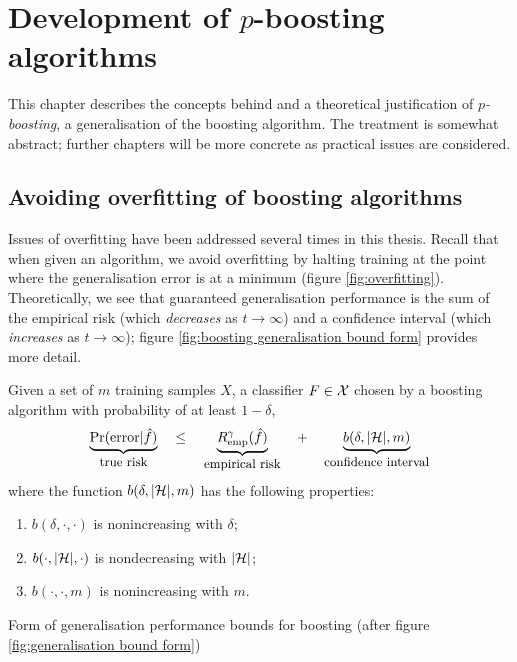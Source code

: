
\chapter{Development of $p$-boosting algorithms}
\label{chapter:pboosting}

This chapter describes the concepts behind and a theoretical
justification of \emph{$p$-boosting}, a generalisation of the boosting
algorithm.  The treatment is somewhat abstract; further chapters will
be more concrete as practical issues are considered.

\section{Avoiding overfitting of boosting algorithms}

Issues of overfitting have been addressed several times in this
thesis.  Recall that when given an algorithm, we avoid overfitting by
halting training at the point where the generalisation error is at a
minimum (figure \ref{fig:overfitting}).  Theoretically, we see that
guaranteed generalisation performance is the sum of the empirical risk
(which \emph{decreases} as $t \rightarrow \infty$) and a confidence
interval (which \emph{increases} as $t \rightarrow \infty$); figure
\ref{fig:boosting generalisation bound form} provides more detail.

\begin{linefigure}
Given a set of $m$ training samples $X$, a classifier $F \in \mathcal{X}$
chosen by a boosting algorithm  with probability of at least $1 - \delta$,
%
\begin{equation}
\underbrace{\Pr(\mathrm{error}|\hat{f})}_{\mbox{\small{true risk}}}
\quad \leq \quad
\underbrace{R_{\mathrm{emp}}^{\gamma}(\hat{f})}_{\mbox{\small{empirical risk}}}
\quad + \quad
\underbrace{b(\delta, |\mathcal{H}|, m)}_{\mbox{\small{confidence interval}}}
\label{eqn:boosting general bound}
\end{equation}
%
where the function $b(\delta, |\mathcal{H}|, m)$ has the following
properties:
\begin{enumerate}
\item	$b(\delta, \cdot, \cdot)$ is nonincreasing with $\delta$;
\item	$b(\cdot, |\mathcal{H}|, \cdot)$ is nondecreasing with $|\mathcal{H}|$;
\item	$b(\cdot, \cdot, m)$ is nonincreasing with $m$.
\end{enumerate}
\caption{Form of generalisation performance bounds for boosting (after
figure \ref{fig:generalisation bound form})}
\label{fig:boosting generalisation bound form}
\end{linefigure}

